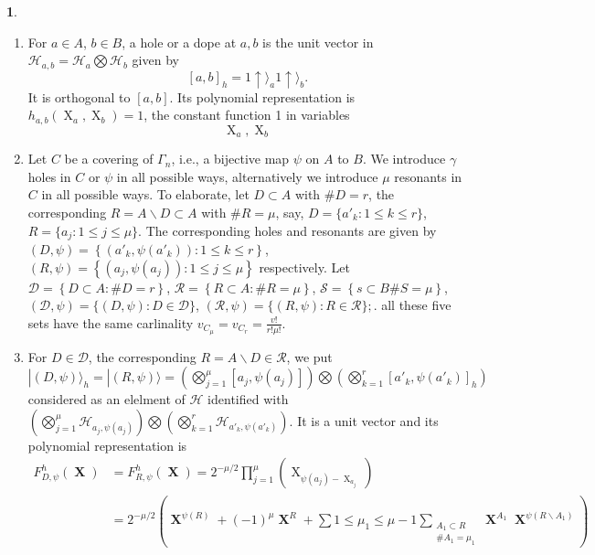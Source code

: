 \documentclass[a4paper,12pt]{article}
\DeclareMathOperator{\x}{\mathrm{X}}
\theoremstyle{definition}
\theoremstyle{underlinethm}
\theoremstyle{definition}
\newtheorem{subsubsec}{}[subsection]
\begin{document}
\begin{subsubsec}\label{subsubsection-3.2.1}
\begin{enumerate}[label=(\alph*)]
\item  For $a \in A$, $b \in B$, a hole or a dope at $a, b$ is the unit vector in $\mathcal{H}_{a,b} = \mathcal{H}_{a} \bigotimes \mathcal{H}_{b}$ given by 
$$
[a, b]_{h} = 1 \uparrow \rangle_{a} 1 \uparrow \rangle_{b}.
$$
It is orthogonal to $[a,b]$. Its polynomial representation is $h_{a,b} (\x_{a}, \x_{b})=1$, the constant function 1 in variables 
\begin{equation}
\x_{a}, \x_{b}\tag{3.73}\label{eq-3.73}
\end{equation}

\item Let $C$ be a covering of $\Gamma_{n}$, i.e., a bijective map $\psi$ on $A$ to $B$. We introduce $\gamma$ holes in $C$ or $\psi$ in all possible ways, alternatively we introduce $\mu$ resonants in $C$ in all possible ways. To elaborate, let $D\subset A$ with $\# D = r$, the corresponding $R = A \smallsetminus D \subset A$ with $\# R = \mu$, say, $D = \{a'_{k}: 1 \leq k \leq r \}$, $R = \{a_{j} : 1 \leq j \leq \mu \}$. The corresponding holes and resonants are given by $(D, \psi) = \left\{\left(a'_{k}, \psi(a'_{k})\right) : 1 \leq k \leq r\right\}$, $(R, \psi) = \left\{\left(a_{j}, \psi(a_{j})\right) : 1 \leq j \leq \mu \right\}$ respectively. Let $\mathcal{D} = \left\{D \subset A : \# D=r\right\}$, $\mathcal{R}=\left\{R \subset A : \# R = \mu\right\}$, $\mathcal{S}=\left\{s\subset B \# S=\mu\right\}$, $(\mathcal{D}, \psi) = \{(D, \psi) : D \in  \mathcal{D}\}$, $(\mathcal{R},\psi) = \{(R, \psi) : R \in \mathcal{R}\};$. all these five sets have the same carlinality $v_{C_{\mu}} = v_{C_{r}} = \frac{v !}{r ! \mu !}$.

\item For $D \in \mathcal{D}$, the corresponding $R = A \smallsetminus D \in \mathcal{R}$, we put $| (D , \psi) \rangle_{h} = | (R, \psi) \rangle = \left(\bigotimes\limits_{j=1}^{\mu} [a_{j}, \psi (a_{j})] \right) \bigotimes \left(\bigotimes\limits_{k=1}^{r} [a'_{k}, \psi (a'_{k})]_{h}\right)$ considered as an elelment of $\mathcal{H}$ identified with $\left(\bigotimes\limits_{j=1}^{\mu} \mathcal{H}_{a_{j}, \psi(a_{j})}\right) \bigotimes \left(\bigotimes\limits_{k=1}^{r} \mathcal{H}_{a'_{k}, \psi (a'_{k})} \right)$. It is a unit vector and its polynomial representation is
\begin{align*}
F_{D, \psi}^{h} (\boldsymbol{\x}) &= F_{R, \psi}^{h}(\boldsymbol{\x}) = 2^{-\mu/2} \prod_{j=1}^{\mu} \left(\x_{\psi(a_{j}) - \x_{a_{j}}}\right)\\
 & = 2^{-\mu/2} \left(\boldsymbol{\x}^{\psi(R)} + (-1)^{\mu} \boldsymbol{\x}^{R} + \sum{1 \leq \mu_{1} \leq \mu-1} \sum_{\substack{A_{1} \subset R \\ \#A_{1} = \mu_{1}}}\boldsymbol{\x}^{A_{1}} \boldsymbol{\x}^{\psi(R \smallsetminus A_{1})}\right)\tag{3.74}\label{eq-3.74}
\end{align*} 


\end{enumerate}
\end{subsubsec}
\end{document}
